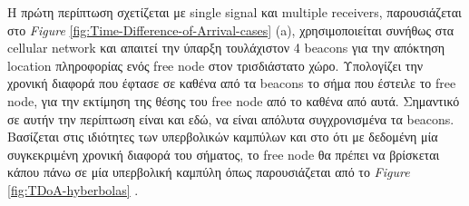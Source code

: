 Η πρώτη περίπτωση σχετίζεται με single signal και multiple receivers, παρουσιάζεται στο 
\emph{Figure} \ref{fig:Time-Difference-of-Arrival-cases} (a), 
χρησιμοποιείται συνήθως στα cellular network και απαιτεί την ύπαρξη 
τουλάχιστον 4 beacons για την απόκτηση location πληροφορίας ενός free node στον τρισδιάστατο χώρο. Υπολογίζει την χρονική διαφορά
που έφτασε σε καθένα από τα beacons το σήμα που έστειλε το free node, για την εκτίμηση της θέσης του free node από
το καθένα από αυτά. Σημαντικό σε αυτήν την περίπτωση είναι και εδώ, να είναι απόλυτα συγχρονισμένα τα beacons. 
Βασίζεται στις ιδιότητες των υπερβολικών καμπύλων και στο ότι με δεδομένη μία συγκεκριμένη χρονική διαφορά του σήματος, 
το free node θα πρέπει να βρίσκεται κάπου πάνω σε μία υπερβολική καμπύλη όπως παρουσιάζεται από το \emph{Figure} \ref{fig:TDoA-hyberbolas}
\cite{youtube-angle-of-arrival-tdoa-hyberbolas}. 

